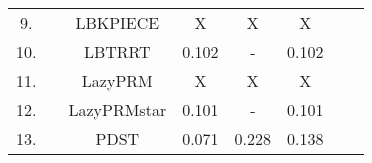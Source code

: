 \begin{table}[H]
\begin{tabular}{|c|c|c|c|c|c|ll}
\cellcolor[HTML]{FFCCC9}9.   &                                                                                                                                & \cellcolor[HTML]{FFCCC9}LBKPIECE    & \cellcolor[HTML]{FFCCC9}X                                                                      & \cellcolor[HTML]{FFCCC9}X                                                                      & \cellcolor[HTML]{FFCCC9}X                                                                      &  &  \\ \cline{1-1} \cline{3-6}
\cellcolor[HTML]{C0C0C0}10.  &                                                                                                                                & \cellcolor[HTML]{C0C0C0}LBTRRT      & \cellcolor[HTML]{C0C0C0}0.102                                                                  & \cellcolor[HTML]{C0C0C0}-                                                                      & \cellcolor[HTML]{C0C0C0}0.102                                                                  &  &  \\ \cline{1-1} \cline{3-6}
\cellcolor[HTML]{FFCCC9}11.  &                                                                                                                                & \cellcolor[HTML]{FFCCC9}LazyPRM     & \cellcolor[HTML]{FFCCC9}X                                                                      & \cellcolor[HTML]{FFCCC9}X                                                                      & \cellcolor[HTML]{FFCCC9}X                                                                      &  &  \\ \cline{1-1} \cline{3-6}
\cellcolor[HTML]{C0C0C0}12.  &                                                                                                                                & \cellcolor[HTML]{C0C0C0}LazyPRMstar & \cellcolor[HTML]{C0C0C0}0.101                                                                  & \cellcolor[HTML]{C0C0C0}-                                                                      & \cellcolor[HTML]{C0C0C0}0.101                                                                  &  &  \\ \cline{1-1} \cline{3-6}
\cellcolor[HTML]{EFEFEF}13.  &                                                                                                                                & \cellcolor[HTML]{EFEFEF}PDST        & \cellcolor[HTML]{EFEFEF}0.071                                                                  & \cellcolor[HTML]{EFEFEF}0.228                                                                  & \cellcolor[HTML]{EFEFEF}0.138                                                                  &  &  \\ \cline{1-1} \cline{3-6}

\end{tabular}
\end{table}
